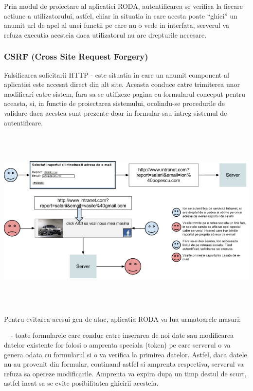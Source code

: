 \bigskip

{\sffamily\color{black}
Prin modul de proiectare al aplicatiei RODA, autentificarea se verifica la fiecare actiune a utilizatorului, astfel,
chiar in situatia in care acesta poate ``ghici'' un anumit url de apel al unei functii pe care nu o vede in interfata,
serverul va refuza executia acesteia daca utilizatorul nu are drepturile necesare.}

\bigskip

\subsubsection{CSRF (Cross Site Request Forgery)}

\bigskip

{\sffamily\color{black}
Falsificarea solicitarii HTTP - este situatia in care un anumit component al aplicatiei este accesat direct din alt
site. Aceasta conduce catre trimiterea unor modificari catre sistem, fara sa se utilizeze pagina cu formularul conceput
pentru aceasta, si, in functie de proiectarea sistemului, ocolindu-se procedurile de validare daca acestea sunt
prezente doar in formular sau intreg sistemul de autentificare.}

\bigskip

\includegraphics[width=6.8437in,height=3.6457in]{SecuritateaarhiveiRODA-img005.png} 

\bigskip

{\sffamily\color{black}
Pentru evitarea acesui gen de atac, aplicatia RODA va lua urmatoarele masuri:}

{\sffamily\color{black}
\ \ {}- toate formularele care conduc catre inserarea de noi date sau modificarea datelor existente for folosi o
amprenta speciala (token) pe care serverul o va genera odata cu formularul si o va verifica la primirea datelor.
Astfel, daca datele nu au provenit din formular, continand astfel si amprenta respectiva, serverul va refuza sa opereze
modificarile. Amprenta va expira dupa un timp destul de scurt, astfel incat sa se evite posibilitatea ghicirii
acesteia. }

